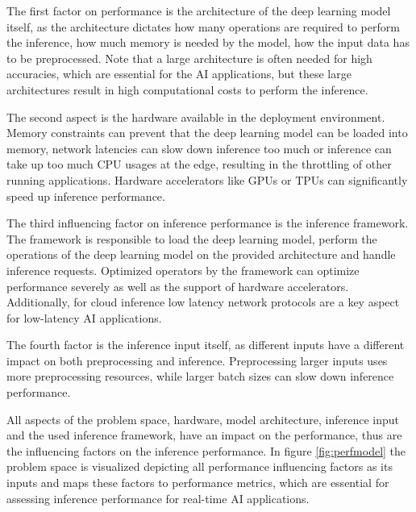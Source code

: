 The first factor on performance is the architecture of the deep learning model itself, as the architecture dictates how many operations are required to perform the inference, how much memory is needed by the model, how the input data has to be preprocessed.
Note that a large architecture is often needed for high accuracies, which are essential for the AI applications, but these large architectures result in high computational costs to perform the inference.

The second aspect is the hardware available in the deployment environment. 
Memory constraints can prevent that the deep learning model can be loaded into memory, network latencies can slow down inference too much or inference can take up too much CPU usages at the edge, resulting in the throttling of other running applications.
Hardware accelerators like GPUs or TPUs can significantly speed up inference performance.

The third influencing factor on inference performance is the inference framework. 
The framework is responsible to load the deep learning model, perform the operations of the deep learning model on the provided architecture and handle inference requests.
Optimized operators by the framework can optimize performance severely as well as the support of hardware accelerators.
Additionally, for cloud inference low latency network protocols are a key aspect for low-latency AI applications.

The fourth factor is the inference input itself, as different inputs have a different impact on both preprocessing and inference. 
Preprocessing larger inputs uses more preprocessing resources, while larger batch sizes can slow down inference performance.

All aspects of the problem space, hardware, model architecture, inference input and the used inference framework, have an impact on the performance, thus are the influencing factors on the inference performance.
In figure \ref{fig:perfmodel} the problem space is visualized depicting all performance influencing factors as its inputs and maps these factors to performance metrics, which are essential for assessing inference performance for real-time AI applications.

